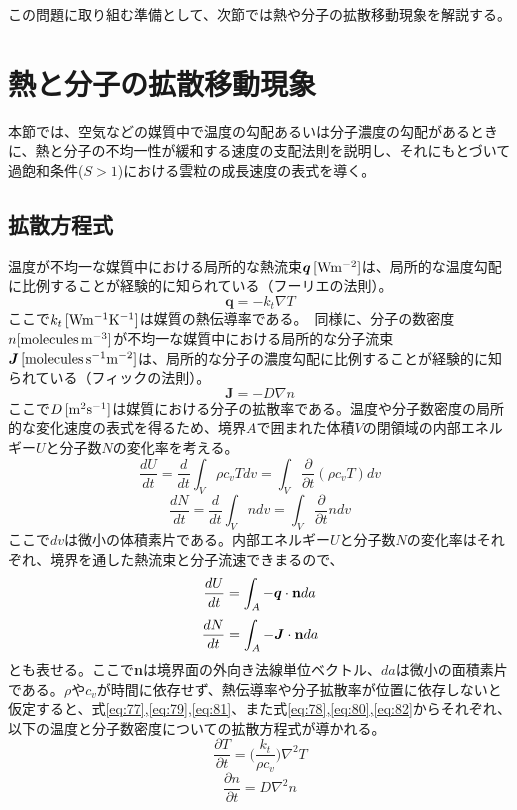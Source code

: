 \documentclass{ltjsarticle}
\begin{document}
この問題に取り組む準備として、次節では熱や分子の拡散移動現象を解説する。

\section{熱と分子の拡散移動現象}
本節では、空気などの媒質中で温度の勾配あるいは分子濃度の勾配があるときに、熱と分子の不均一性が緩和する速度の支配法則を説明し、それにもとづいて過飽和条件($S>1$)における雲粒の成長速度の表式を導く。

\subsection{拡散方程式}
温度が不均一な媒質中における局所的な熱流束$\bm{q}\, \rm[Wm^{-2}]$は、局所的な温度勾配に比例することが経験的に知られている（フーリエの法則）。
\begin{equation}\label{eq:77}
\bm{q}=-k_{t}\nabla T
\end{equation}
ここで$k_{t} \, \rm[W m^{-1} K^{-1}]$は媒質の熱伝導率である。　同様に、分子の数密度$n\rm[molecules\, m^{-3}]$が不均一な媒質中における局所的な分子流束$\bm{J}\, \rm[molecules\, s^{-1}m^{-2}]$は、局所的な分子の濃度勾配に比例することが経験的に知られている（フィックの法則）。
\begin{equation}\label{eq:78}
\bm{J}=-D\nabla n
\end{equation}
ここで$D \, \rm[m^{2} s^{-1}]$は媒質における分子の拡散率である。温度や分子数密度の局所的な変化速度の表式を得るため、境界$A$で囲まれた体積$V$の閉領域の内部エネルギー$U$と分子数$N$の変化率を考える。
\begin{equation}\label{eq:79}
\frac{dU}{dt}=\frac{d}{dt} \int_{V} \rho c_{v}T dv = \int_{V} \frac {\partial}{\partial t} (\rho c_{v}T) dv
\end{equation}
\begin{equation}\label{eq:80}
\frac{dN}{dt}=\frac{d}{dt} \int_{V} n dv = \int_{V} \frac {\partial}{\partial t} n dv
\end{equation}
ここで$dv$は微小の体積素片である。内部エネルギー$U$と分子数$N$の変化率はそれぞれ、境界を通した熱流束と分子流速できまるので、
\begin{equation}\label{eq:81}
\frac{dU}{dt}=\int_{A} -\bm{q}\cdot {\bf n} da
\end{equation}
\begin{equation}\label{eq:82}
\frac{dN}{dt}=\int_{A} -\bm{J}\cdot {\bf n} da
\end{equation}
とも表せる。ここで{\bf n}は境界面の外向き法線単位ベクトル、$da$は微小の面積素片である。$\rho$や$c_{v}$が時間に依存せず、熱伝導率や分子拡散率が位置に依存しないと仮定すると、式\eqref{eq:77},\eqref{eq:79},\eqref{eq:81}、また式\eqref{eq:78},\eqref{eq:80},\eqref{eq:82}からそれぞれ、以下の温度と分子数密度についての拡散方程式が導かれる。
\begin{equation}\label{eq:83}
\frac{\partial T}{\partial t}= {\bigg (}\frac{k_{t}}{\rho c_{v}}{\bigg )}\nabla^{2}T
\end{equation}
\begin{equation}\label{eq:84}
\frac{\partial n}{\partial t}= D\nabla^{2}n
\end{equation}
\end{document}

